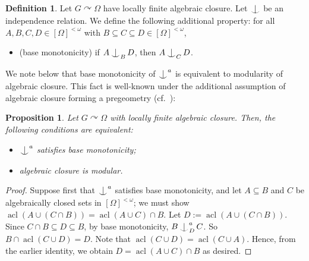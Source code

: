 \documentclass{article}
\newtheorem{prop}[theorem]{Proposition}
\theoremstyle{remark}
\theoremstyle{definition}
\newtheorem{definition}[theorem]{Definition}
\def\acts{\curvearrowright}
\DeclareMathOperator{\acl}{acl}
\def\Ind#1#2{#1\setbox0=\hbox{$#1x$}\kern\wd0\hbox to 0pt{\hss$#1\mid$\hss}
	\lower.9\ht0\hbox to 0pt{\hss$#1\smile$\hss}\kern\wd0}
\def\ind{\mathop{\mathpalette\Ind{}}}
\newcommand{\fps}[1]{[#1]^{<\omega}}
\begin{document}
{{{{{ 
  

   






\begin{definition} 
Let $G\acts\Omega$ have locally finite algebraic closure. Let $\ind$ be an  independence relation. We define the following additional property: for all $A,B,C,D\in \fps{\Omega}$ with $B\subseteq C\subseteq D\in[\Omega]^{<\omega}$, 
\begin{itemize}
    \item (base monotonicity)  if $A\ind_{B} D$, then $A\ind_C D$.
\end{itemize}
\end{definition}

{We note below that base monotonicity of $\ind^{a}$ is equivalent to modularity of algebraic closure. This fact is well-known under the additional assumption of algebraic closure forming a pregeometry (cf.~\cite[Proposition 1.2.17]{d2023axiomatic}):}

\begin{prop}\label{prop:modularity} {Let $G\acts\Omega$ with locally finite algebraic closure. Then, the following conditions are equivalent:}
\begin{itemize}
    \item $\ind^{a}$ satisfies base monotonicity;
    \item algebraic closure is modular.
\end{itemize}
\end{prop}
\begin{proof} {%
{Suppose first that $\ind^{a}$ satisfies base monotonicity, and let $A\subseteq B$ and $C$
be algebraically closed sets in $\fps{\Omega}$; we must show
$\acl(A\cup(C\cap B))=\acl(A\cup C)\cap B$.}
Let $D:=\acl(A\cup(C\cap B))$. Since $C\cap B\subseteq D\subseteq B$, by base monotonicity, $B\ind^a_{D} C$. So $B\cap\acl(C\cup D)=D$. Note that $\acl(C\cup D)=\acl(C\cup A)$. Hence, from the earlier identity, we obtain $D=\acl(A\cup C)\cap B$ as desired.}


\end{proof}}}}}}
\end{document}
